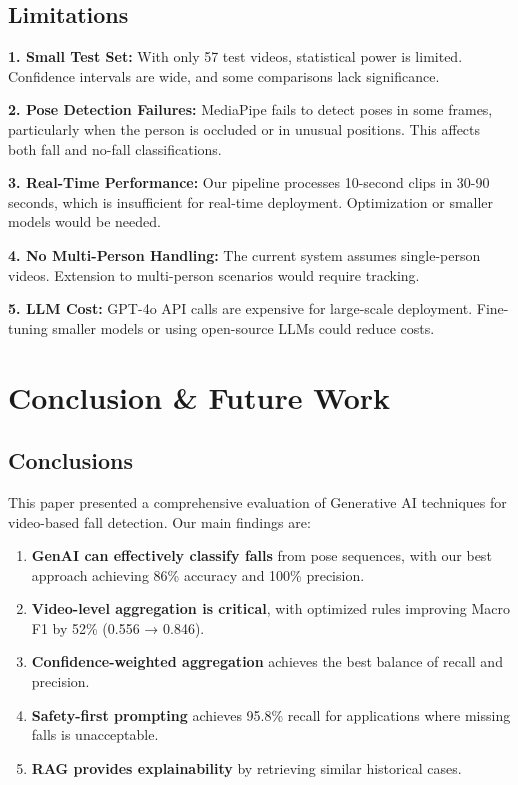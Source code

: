 \documentclass[conference]{IEEEtran}
\begin{document}
\subsection{Limitations}

\textbf{1. Small Test Set:}
With only 57 test videos, statistical power is limited. Confidence intervals are wide, and some comparisons lack significance.

\textbf{2. Pose Detection Failures:}
MediaPipe fails to detect poses in some frames, particularly when the person is occluded or in unusual positions. This affects both fall and no-fall classifications.

\textbf{3. Real-Time Performance:}
Our pipeline processes 10-second clips in 30-90 seconds, which is insufficient for real-time deployment. Optimization or smaller models would be needed.

\textbf{4. No Multi-Person Handling:}
The current system assumes single-person videos. Extension to multi-person scenarios would require tracking.

\textbf{5. LLM Cost:}
GPT-4o API calls are expensive for large-scale deployment. Fine-tuning smaller models or using open-source LLMs could reduce costs.

\section{Conclusion \& Future Work}

\subsection{Conclusions}

This paper presented a comprehensive evaluation of Generative AI techniques for video-based fall detection. Our main findings are:

\begin{enumerate}
    \item \textbf{GenAI can effectively classify falls} from pose sequences, with our best approach achieving 86\% accuracy and 100\% precision.
    
    \item \textbf{Video-level aggregation is critical}, with optimized rules improving Macro F1 by 52\% (0.556 → 0.846).
    
    \item \textbf{Confidence-weighted aggregation} achieves the best balance of recall and precision.
    
    \item \textbf{Safety-first prompting} achieves 95.8\% recall for applications where missing falls is unacceptable.
    
    \item \textbf{RAG provides explainability} by retrieving similar historical cases.
\end{enumerate}
\end{document}
